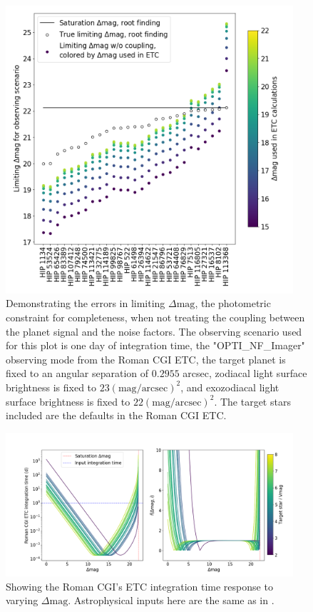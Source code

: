 \begin{figure}
  \begin{center}
    \includegraphics[width=0.95\textwidth]{ch2/figures/coupling.png}
  \end{center}
  \caption{Demonstrating the errors in limiting $\Delta\textrm{mag}$, the
  photometric constraint for completeness, when not treating the coupling
  between the planet signal and the noise factors. The observing scenario
  used for this plot is one day of integration time, the "OPTI\_NF\_Imager"
  observing mode from the Roman CGI ETC, the target planet is fixed to an
  angular separation of $0.2955$ arcsec, zodiacal light surface brightness is fixed to
  $23 (\textrm{mag}/\textrm{arcsec})^2$, and exozodiacal light surface brightness is
  fixed to $22 (\textrm{mag}/\textrm{arcsec})^2$. The target stars included are the defaults
  in the Roman CGI ETC.}
  \label{fig:CGI_coupling}
\end{figure}

\begin{figure}
  \begin{center}
    \includegraphics[width=0.95\textwidth]{ch2/figures/ETC_dMag_function.png}
  \end{center}
  \caption{Showing the Roman CGI's ETC integration time response to varying
  $\Delta\textrm{mag}$. Astrophysical inputs here are the same
  as in .}
  \label{fig:ETC_dMag_function}
\end{figure}

